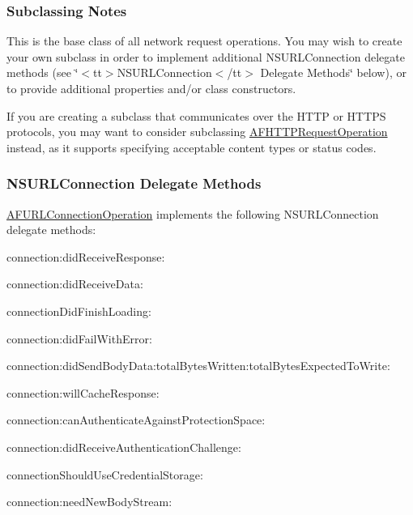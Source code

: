 \subsubsection*{Subclassing Notes}

This is the base class of all network request operations. You may wish to create your own subclass in order to implement additional {\ttfamily N\-S\-U\-R\-L\-Connection} delegate methods (see \char`\"{}$<$tt$>$\-N\-S\-U\-R\-L\-Connection$<$/tt$>$ Delegate Methods\char`\"{} below), or to provide additional properties and/or class constructors.

If you are creating a subclass that communicates over the H\-T\-T\-P or H\-T\-T\-P\-S protocols, you may want to consider subclassing {\ttfamily \hyperlink{interface_a_f_h_t_t_p_request_operation}{A\-F\-H\-T\-T\-P\-Request\-Operation}} instead, as it supports specifying acceptable content types or status codes.

\subsubsection*{N\-S\-U\-R\-L\-Connection Delegate Methods}

{\ttfamily \hyperlink{interface_a_f_u_r_l_connection_operation}{A\-F\-U\-R\-L\-Connection\-Operation}} implements the following {\ttfamily N\-S\-U\-R\-L\-Connection} delegate methods\-:


\begin{DoxyItemize}
\item {\ttfamily connection\-:did\-Receive\-Response\-:}
\item {\ttfamily connection\-:did\-Receive\-Data\-:}
\item {\ttfamily connection\-Did\-Finish\-Loading\-:}
\item {\ttfamily connection\-:did\-Fail\-With\-Error\-:}
\item {\ttfamily connection\-:did\-Send\-Body\-Data\-:total\-Bytes\-Written\-:total\-Bytes\-Expected\-To\-Write\-:}
\item {\ttfamily connection\-:will\-Cache\-Response\-:}
\item {\ttfamily connection\-:can\-Authenticate\-Against\-Protection\-Space\-:}
\item {\ttfamily connection\-:did\-Receive\-Authentication\-Challenge\-:}
\item {\ttfamily connection\-Should\-Use\-Credential\-Storage\-:}
\item {\ttfamily connection\-:need\-New\-Body\-Stream\-:}
\end{DoxyItemize}

